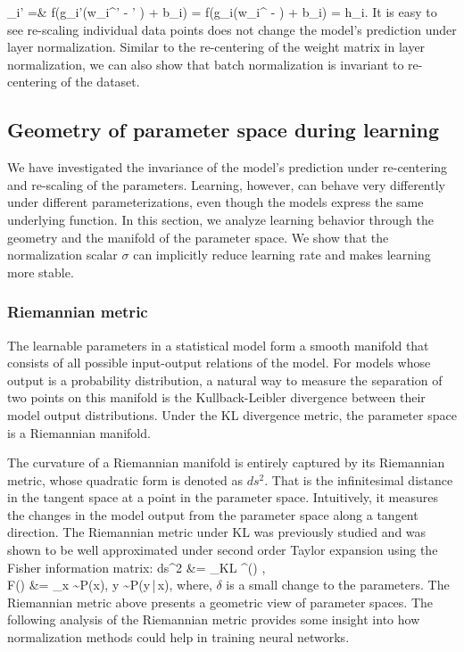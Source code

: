 _i' =& f({{g}_i\over\sigma'}\left(w_i^' - \mu' \right) + {b}_i) = f({{g}_i\over{\delta\sigma}}\left(\delta w_i^ - \delta\mu \right) + {b}_i) = {h}_i.
\eea
It is easy to see re-scaling individual data points does not change the model's prediction under layer normalization. Similar to the re-centering of the weight matrix in layer normalization, we can also show that batch normalization is invariant to re-centering of the dataset.

\subsection{Geometry of parameter space during learning} We have investigated the invariance of the model's prediction under re-centering and re-scaling of the parameters. Learning, however, can behave very differently under different parameterizations, even though the models express the same underlying function. In this section, we analyze learning behavior through the geometry and the manifold of the parameter space. We show that the normalization scalar $\sigma$ can implicitly reduce learning rate and makes learning more stable.

\subsubsection{Riemannian metric} The learnable parameters in a statistical model form a smooth manifold that consists of all possible input-output relations of the model. For models whose output is a probability distribution, a natural way to measure the separation of two points on this manifold is the Kullback-Leibler divergence between their model output distributions. Under the KL divergence metric, the parameter space is a Riemannian manifold.

The curvature of a Riemannian manifold is entirely captured by its Riemannian metric, whose quadratic form is denoted as $ds^2$. That is the infinitesimal distance in the tangent space at a point in the parameter space. Intuitively, it measures the changes in the model output from the parameter space along a tangent direction. The Riemannian metric under KL was previously studied \citep{amari1998natural} and was shown to be well approximated under second order Taylor expansion using the Fisher information matrix: 
\bea
ds^2 &= _{\rm KL} \approx {} \delta^(\theta) \delta, \\
{F}(\theta) &= _{{\bold x} \sim P({\bold x}), y \sim P(y\,|\,{\bold x})},
\eea
where, $\delta$ is a small change to the parameters. The Riemannian metric above presents a geometric view of parameter spaces. The following analysis of the Riemannian metric provides some insight into how normalization methods could help in training neural networks.

